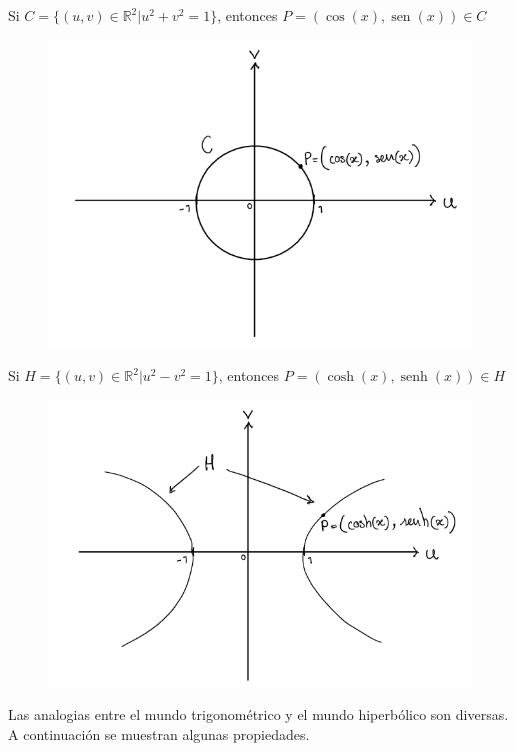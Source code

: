 \documentclass{article}
\numberwithin{equation}{section}
\DeclareMathOperator{\sen}{sen}
\DeclareMathOperator{\senh}{senh}
\begin{document}
\begin{multicols}{2}
    Si $C=\{(u,v)\in\mathbb{R}^2 | u^2+v^2=1\}$, entonces $P=(\cos(x), \sen(x))\in C$
    \begin{figure}[H]
        \centering
        \includegraphics[scale=0.4]{images/fig19.png}
        \label{fig:fig19}
    \end{figure}
    Si $H=\{(u,v)\in\mathbb{R}^2 | u^2-v^2=1\}$, entonces $P=(\cosh(x), \senh(x))\in H$
    \begin{figure}[H]
        \centering
        \includegraphics[scale=0.4]{images/fig20.png}
        \label{fig:fig20}
    \end{figure}
\end{multicols}

Las analogias entre el mundo trigonométrico y el mundo hiperbólico son diversas. A continuación se muestran algunas propiedades.
\end{document}
